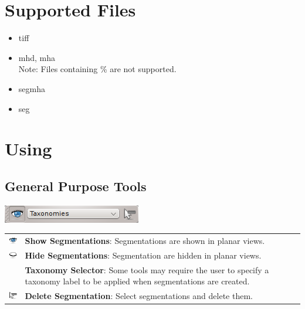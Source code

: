 \section{Supported Files}
\begin{itemize}
  \item tiff
  \item mhd, mha\\
    Note: Files containing \% are not supported.
  \item segmha
  \item seg
\end{itemize}

\section{Using \espina}

\subsection{General Purpose Tools}
\begin{center}
\includegraphics{fig/MainToolbar}
\end{center}
\vspace{0.3cm}

\begin{tabular}{m{0.8cm} m{13cm}}
\includegraphics[width=0.7cm]{../../frontend/rsc/show_all} &
\textbf{Show Segmentations}: Segmentations are shown in planar views.\\
\includegraphics[width=0.7cm]{../../frontend/rsc/hide_all} &
\textbf{Hide Segmentations}: Segmentation are hidden in planar views.\\
 & %
\textbf{Taxonomy Selector}: Some tools may require the user to specify a
taxonomy label to be applied when segmentations are created.\\
\includegraphics[width=0.7cm]{../../frontend/rsc/removeSeg} &
\textbf{Delete Segmentation}: Select segmentations and delete them.
\end{tabular}

